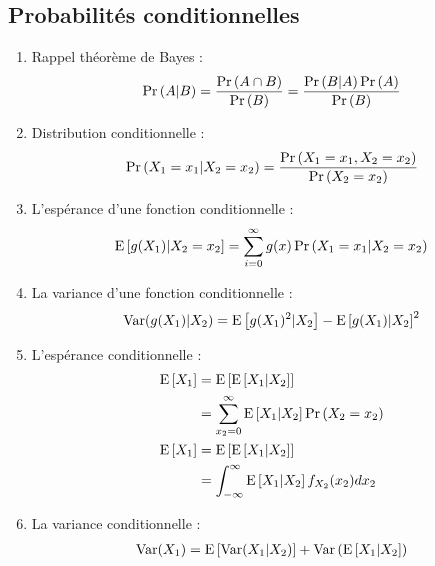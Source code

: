 \documentclass[10pt, french, landscape]{article}
\begin{document}
\small
\begin{multicols*}{2} %
\section{Probabilités conditionnelles}
\begin{enumerate}[label=\faAngleRight]
\item Rappel théorème de Bayes : 
\begin{align*}
\Pr \left( A | B \right) = \frac{\Pr \left( A \cap B \right)}{\Pr \left( B \right)} = \frac{\Pr \left( B|A \right) \Pr \left( A \right)}{\Pr \left( B \right)}
\end{align*}

\item Distribution conditionnelle : 
\begin{align*}
\Pr \left( X_1 = x_1 | X_2 = x_2 \right) & = \frac{\Pr \left( X_1 = x_1, X_2 = x_2 \right)}{\Pr \left( X_2 = x_2 \right)} \\
\end{align*}

\item L'espérance d'une fonction conditionnelle : 
\begin{align*}
\mathrm{E} \left[ g(X_1) | X_2 = x_2 \right] = \sum_{i=0}^{\infty} g(x) \Pr \left( X_1 = x_1 | X_2 = x_2 \right)
\end{align*}

\item La variance d'une fonction conditionnelle :
\begin{align*}
\mathrm{Var} (g(X_1) | X_2) = \mathrm{E} \left[ g(X_1)^2 |X_2 \right] - \mathrm{E} \left[ g(X_1) | X_2 \right]^2
\end{align*}

\item L'espérance conditionnelle : 
\begin{align*}
\mathrm{E} \left[ X_1 \right] 	& = \mathrm{E} \left[ \mathrm{E} \left[ X_1 | X_2 \right] \right] \\
			& = \sum_{x_2 = 0}^{\infty} \mathrm{E} \left[ X_1 | X_2 \right] \Pr \left( X_2 = x_2 \right) \\
\mathrm{E} \left[ X_1 \right]	& = \mathrm{E} \left[ \mathrm{E} \left[ X_1 | X_2 \right] \right] \\
			& = \int_{-\infty}^{\infty} \mathrm{E} \left[ X_1 | X_2 \right] f_{X_2}(x_2) d x_2 \\
\end{align*}

\item La variance conditionnelle : 
\begin{align*}
\mathrm{Var} (X_1) = \mathrm{E} \left[ \mathrm{Var} (X_1 | X_2) \right] + \mathrm{Var} \left( \mathrm{E} \left[ X_1 | X_2 \right] \right)
\end{align*}
\end{enumerate}


\end{multicols*}
\end{document}
